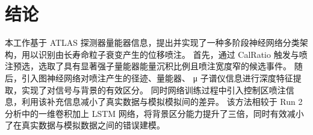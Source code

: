 
\chapter{结论}
本工作基于 ATLAS 探测器量能器信息，提出并实现了一种多阶段神经网络分类架构，用以识别由长寿命粒子衰变产生的位移喷注。
首先，通过 CalRatio 触发与喷注预选，选取了具有显著强子量能器能量沉积比例且喷注宽度窄的候选事件。
随后，引入图神经网络对喷注产生的径迹、量能器、 μ 子谱仪信息进行深度特征提取，实现了对信号与背景的有效区分。
同时网络训练过程中引入控制区喷注信息，利用该补充信息减小了真实数据与模拟模拟间的差异。
该方法相较于 Run 2 分析中的一维卷积加上 LSTM 网络，将背景区分能力提升了三倍，同时有效减小了在真实数据与模拟数据之间的错误建模。
